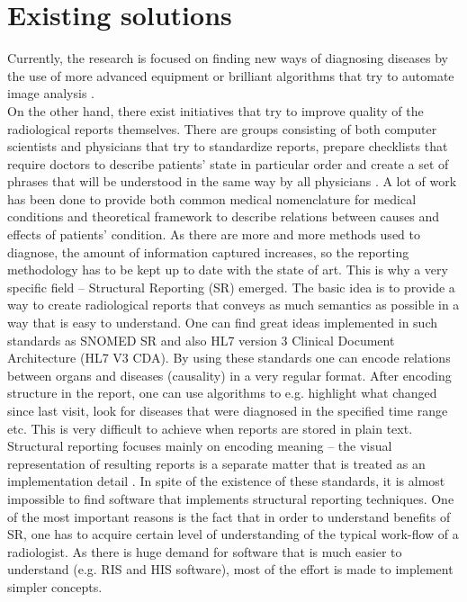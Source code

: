 \documentclass[12pt, twoside, openany]{report}
\theoremstyle{definition}
\begin{document}
\section{Existing solutions}
Currently, the research is focused on finding new ways of diagnosing diseases by  the use of more advanced equipment or brilliant algorithms that try to automate image analysis \cite{ai}. \\
On the other hand, there exist initiatives that try to improve quality of the radiological reports themselves. There are groups consisting of both computer scientists and physicians that try to standardize reports, prepare checklists that require doctors to describe patients' state in particular order and create a set of phrases that will be understood in the same way by all physicians \cite{snomed}. A lot of work has been done to provide both common medical nomenclature for medical conditions and theoretical framework to describe relations between causes and effects of patients' condition. As there are more and more methods used to diagnose, the amount of information captured increases, so the reporting methodology has to be kept up to date with the state of art. This is why a very specific field -- Structural Reporting (SR) emerged. The basic idea is to provide a way to create radiological reports that conveys as much semantics as possible in a way that is easy to understand. One can find great ideas implemented in such standards as SNOMED SR \cite{sr} and also HL7 version 3 Clinical Document Architecture (HL7 V3 CDA). By using these standards one can encode relations between organs and diseases (causality) in a very regular format. After encoding structure in the report, one can use algorithms to e.g. highlight what changed since last visit, look for diseases that were diagnosed in the specified time range etc. This is very difficult to achieve when reports are stored in plain text. Structural reporting focuses mainly on encoding meaning -- the visual representation of resulting reports is a separate matter that is treated as an implementation detail \cite{sr}.
In spite of the existence of these standards, it is almost impossible to find software that implements structural reporting techniques. One of the most important reasons is the fact that in order to understand benefits of SR, one has to acquire certain level of understanding of the typical work-flow of a radiologist. As there is huge demand for software that is much easier to understand (e.g. RIS and HIS software), most of the effort is made to implement simpler concepts.
\\ \\
\end{document}
